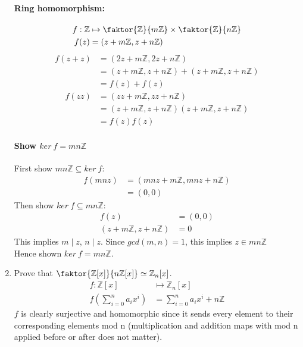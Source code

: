 \documentclass[12pt]{article}
\begin{document}
\begin{enumerate}
		\paragraph{Ring homomorphism:}
		\begin{align*}
			f : \mathbb{Z} &\mapsto \faktor{\mathbb{Z}}{m\mathbb{Z}} \times
				\faktor{\mathbb{Z}}{n\mathbb{Z}}\\
				f(z) &= (z+m\mathbb{Z}, z+n\mathbb{Z})
		\end{align*}
		\begin{align*}
				f(z+z) &= (2z+m\mathbb{Z}, 2z+n\mathbb{Z})\\
							 &= (z+m\mathbb{Z}, z+n\mathbb{Z}) + (z+m\mathbb{Z},
							 z+n\mathbb{Z})\\
							 &= f(z) + f(z)
		\end{align*}
		\begin{align*}
				f(zz) &= (zz+m\mathbb{Z}, zz+n\mathbb{Z})\\
							&= (z+m\mathbb{Z}, z+n\mathbb{Z})(z+m\mathbb{Z}, z+n\mathbb{Z})\\
							&= f(z)f(z)
		\end{align*}

		\paragraph{Show $ker\ f = mn\mathbb{Z}$} $\ $\\
		First show $mn\mathbb{Z} \subseteq ker\ f$:\\
			\begin{align*}
				f(mnz) &= (mnz + m\mathbb{Z}, mnz + n\mathbb{Z})\\
							 &= (0, 0)
			\end{align*}
		Then show $ker\ f \subseteq mn\mathbb{Z}$:\\
			\begin{align*}
				f(z) &= (0, 0)\\
				(z + m\mathbb{Z}, z + n\mathbb{Z}) &= 0
			\end{align*}
		This implies $m \mid z$, $n \mid z$. Since $gcd(m,n) = 1$, this implies $z
		\in mn\mathbb{Z}$\\
		Hence shown $ker\ f = mn\mathbb{Z}$.

	\item Prove that $\faktor{\mathbb{Z}[x]}{n\mathbb{Z}[x]} \simeq
		\mathbb{Z}_n[x]$.
		\begin{align*}
			f:\mathbb{Z}[x] &\mapsto \mathbb{Z}_n[x]\\
			f\left(\sum_{i=0}^n a_ix^i\right) &= \sum_{i=0}^n a_ix^i + n\mathbb{Z}
		\end{align*}
		$f$ is clearly surjective and homomorphic since it sends every element to
		their corresponding elements mod n (multiplication and addition maps with
		mod n applied before or after does not matter).


\end{enumerate}
\end{document}
